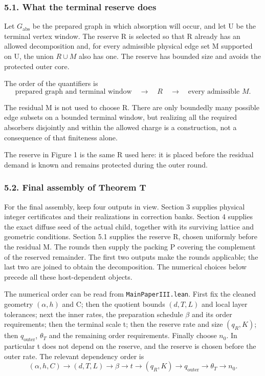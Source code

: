 \documentclass[english,11pt,a4paper]{article}
\begin{document}
\subsubsection{5.1. What the terminal reserve does}\label{what-the-terminal-reserve-does}

Let \(G_{\mathrm{abs}}\) be the prepared graph in which absorption will occur, and let U be the terminal vertex window. The reserve R is selected so that R already has an allowed decomposition and, for every admissible physical edge set M supported on U, the union \(R\cup M\) also has one. The reserve has bounded size and avoids the protected outer core.

The order of the quantifiers is
\[\text{prepared graph and terminal window}
\quad\longrightarrow\quad R
\quad\longrightarrow\quad\text{every admissible }M.                \tag{5.1}\]

The residual M is not used to choose R. There are only boundedly many possible edge subsets on a bounded terminal window, but realizing all the required absorbers disjointly and within the allowed charge is a construction, not a consequence of that finiteness alone.

The reserve in Figure 1 is the same R used here: it is placed before the residual demand is known and remains protected during the outer round.

\subsubsection{5.2. Final assembly of Theorem T}\label{final-assembly-of-theorem-t}

For the final assembly, keep four outputs in view. Section 3 supplies physical integer certificates and their realizations in correction banks. Section 4 supplies the exact diffuse seed of the actual child, together with its surviving lattice and geometric conditions. Section 5.1 supplies the reserve R, chosen uniformly before the residual M. The rounds then supply the packing P covering the complement of the reserved remainder. The first two outputs make the rounds applicable; the last two are joined to obtain the decomposition. The numerical choices below precede all these host-dependent objects.

The numerical order can be read from \texttt{Main\allowbreak{}Paper\allowbreak{}III.\allowbreak{}lean}. First fix the cleaned geometry \((\alpha,h)\) and C; then the quotient bounds \((d,T,L)\) and local layer tolerances; next the inner rates, the preparation schedule \(\beta\) and its order requirements; then the terminal scale t; then the reserve rate and size \((q_R,K)\); then \(q_{\mathrm{outer}}\), \(\theta_T\) and the remaining order requirements. Finally choose \(n_0\). In particular t does not depend on the reserve, and the reserve is chosen before the outer rate. The relevant dependency order is
\[(\alpha,h,C)\longrightarrow(d,T,L)\longrightarrow\beta\longrightarrow t\longrightarrow(q_R,K)\longrightarrow q_{\mathrm{outer}}\longrightarrow\theta_T\longrightarrow n_0.\]
\end{document}
